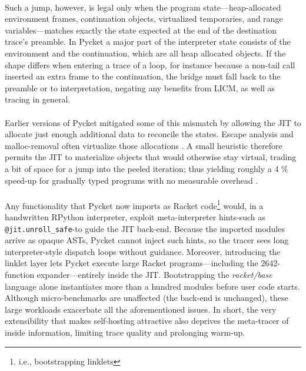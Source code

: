	\paragraph{}%
		Such a jump, however, is legal only when the program state—heap-allocated environment frames, continuation objects, virtualized temporaries, and range variables—matches exactly the state expected at the end of the destination trace's preamble. In Pycket a major part of the interpreter state consists of the environment and the continuation, which are all heap allocated objects. If the shape differs when entering a trace of a loop, for instance because a non-tail call inserted an extra frame to the continuation, the bridge must fall back to the preamble or to interpretation, negating any benefits from LICM, as well as tracing in general.

	\paragraph{}%
		Earlier versions of Pycket mitigated some of this mismatch by allowing the JIT to allocate just enough additional data to reconcile the states. Escape analysis and malloc-removal often virtualize those allocations \cite{malloc-removal:11,loop-aware:12}. A small heuristic therefore permits the JIT to materialize objects that would otherwise stay virtual, trading a bit of space for a jump into the peeled iteration; thus yielding roughly a 4 \% speed-up for gradually typed programs with no measurable overhead \cite{pycketmain2}.

	\paragraph{}%
		Any functionality that Pycket now imports as Racket code\footnote{i.e., bootstrapping linklets} would, in a handwritten RPython interpreter, exploit meta-interpreter hints-such as \verb|@jit.unroll_safe|-to guide the JIT back-end. Because the imported modules arrive as opaque ASTs, Pycket cannot inject such hints, so the tracer sees long interpreter-style dispatch loops without guidance. Moreover, introducing the linklet layer lets Pycket execute large Racket programs—including the 2642-function expander—entirely inside the JIT. Bootstrapping the \emph{racket/base} language alone instantiates more than a hundred modules before user code starts. Although micro-benchmarks are unaffected (the back-end is unchanged), these large workloads exacerbate all the aforementioned issues. In short, the very extensibility that makes self-hosting attractive also deprives the meta-tracer of inside information, limiting trace quality and prolonging warm-up.

